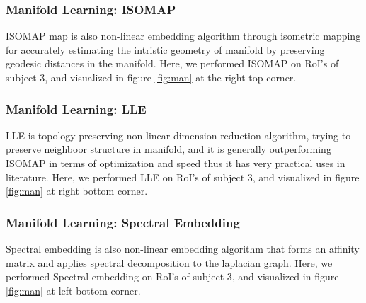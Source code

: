 \documentclass[10pt, twocolumn, letterpaper]{article}
\begin{document}
\subsubsection{Manifold Learning: ISOMAP}
ISOMAP map is also non-linear embedding algorithm through isometric mapping for accurately estimating the intristic geometry of manifold by preserving geodesic distances in the manifold. Here, we performed ISOMAP on RoI's of subject 3, and visualized in figure \ref{fig:man} at the right top corner. 

\subsubsection{Manifold Learning: LLE}
LLE is topology preserving non-linear dimension reduction algorithm, trying to preserve neighboor structure in manifold, and it is generally outperforming ISOMAP in terms of optimization and speed thus it has very practical uses in literature. Here, we performed LLE on RoI's of subject 3, and visualized in figure \ref{fig:man} at right bottom corner. 

\subsubsection{Manifold Learning: Spectral Embedding}
Spectral embedding is also non-linear embedding algorithm that forms an affinity matrix and applies spectral decomposition to the laplacian graph. Here, we performed Spectral embedding on RoI's of subject 3, and visualized in figure \ref{fig:man} at left bottom corner.  
\end{document}
